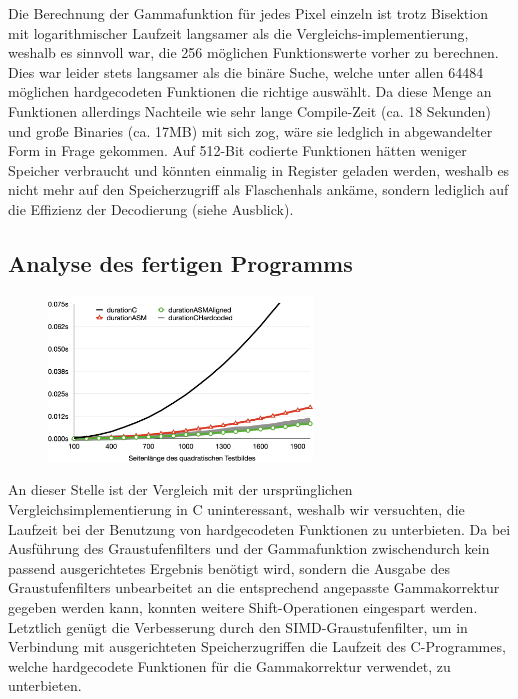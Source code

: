 \documentclass[course=erap]{aspdoc}
\begin{document}
	Die Berechnung der Gammafunktion für jedes Pixel einzeln ist trotz Bisektion mit logarithmischer Laufzeit langsamer als die Vergleichs-implementierung, weshalb es sinnvoll war, die 256 möglichen Funktionswerte vorher zu berechnen. \\
	Dies war leider stets langsamer als die binäre Suche, welche unter allen 64484 möglichen hardgecodeten Funktionen die richtige auswählt.
	Da diese Menge an Funktionen allerdings Nachteile wie sehr lange Compile-Zeit (ca. 18 Sekunden) und große Binaries (ca. 17MB) mit sich zog, wäre sie ledglich in abgewandelter Form in Frage gekommen. Auf 512-Bit codierte Funktionen hätten weniger Speicher verbraucht und könnten einmalig in Register geladen werden, weshalb es nicht mehr auf den Speicherzugriff als Flaschenhals ankäme, sondern lediglich auf die Effizienz der Decodierung (siehe Ausblick).
	\subsection{Analyse des fertigen Programms}
	\begin{figure}
		\includegraphics[width=7cm]{Images/Both.png}
	\end{figure}
	An dieser Stelle ist der Vergleich mit der ursprünglichen Vergleichsimplementierung in C uninteressant, weshalb wir versuchten, die Laufzeit bei der Benutzung von hardgecodeten Funktionen zu unterbieten.
	Da bei Ausführung des Graustufenfilters und der Gammafunktion zwischendurch kein passend ausgerichtetes Ergebnis benötigt wird, sondern die Ausgabe des Graustufenfilters unbearbeitet an die entsprechend angepasste Gammakorrektur gegeben werden kann, konnten weitere Shift-Operationen eingespart werden.
	Letztlich genügt die Verbesserung durch den SIMD-Graustufenfilter, um in Verbindung mit ausgerichteten Speicherzugriffen die Laufzeit des C-Programmes, welche hardgecodete Funktionen für die Gammakorrektur verwendet, zu unterbieten.
\end{document}
